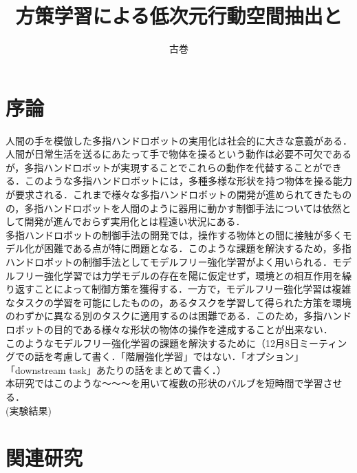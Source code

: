 \documentclass[dvipdfmx]{ampbt_nomag}
\title{方策学習による低次元行動空間抽出と
}     %
      {実環境における物体操り動作獲得}                             %
      {}                                              %
\author{古巻}{鉄平}             %
\begin{document}
\ifoutputbody
\makeinsidecover                %
\makeabstract                   %
\maketoc                        %
\setcounter{page}{1}            %
\section{序論}\label{sec-intro}		%
人間の手を模倣した多指ハンドロボットの実用化は社会的に大きな意義がある．人間が日常生活を送るにあたって手で物体を操るという動作は必要不可欠であるが，多指ハンドロボットが実現することでこれらの動作を代替することができる．このような多指ハンドロボットには，多種多様な形状を持つ物体を操る能力が要求される．これまで様々な多指ハンドロボットの開発が進められてきたものの，多指ハンドロボットを人間のように器用に動かす制御手法については依然として開発が進んでおらず実用化とは程遠い状況にある．\\
多指ハンドロボットの制御手法の開発では，操作する物体との間に接触が多くモデル化が困難である点が特に問題となる．このような課題を解決するため，多指ハンドロボットの制御手法としてモデルフリー強化学習がよく用いられる．モデルフリー強化学習では力学モデルの存在を陽に仮定せず，環境との相互作用を繰り返すことによって制御方策を獲得する\cite{RLBook}．一方で，モデルフリー強化学習は複雑なタスクの学習を可能にしたものの，あるタスクを学習して得られた方策を環境のわずかに異なる別のタスクに適用するのは困難である\cite{hua2021learning}．このため，多指ハンドロボットの目的である様々な形状の物体の操作を達成することが出来ない．\\
このようなモデルフリー強化学習の課題を解決するために（12月8日ミーティングでの話を考慮して書く．「階層強化学習」ではない．「オプション」「downstream task」あたりの話をまとめて書く．）
\\
本研究ではこのような〜〜〜を用いて複数の形状のバルブを短時間で学習させる．\\
(実験結果)\\

\clearpage
\section{関連研究}\label{sec-related_papers}
\end{document}

